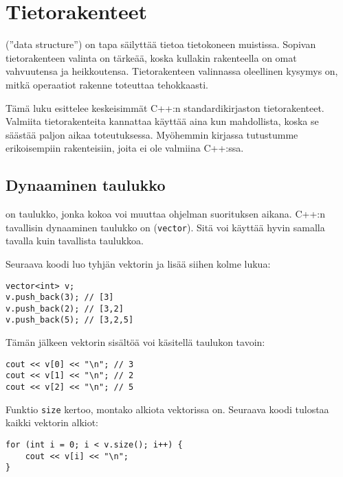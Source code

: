 \chapter{Tietorakenteet}


 (''data structure'')
on tapa säilyttää tietoa tietokoneen muistissa.
Sopivan tietorakenteen valinta on tärkeää,
koska kullakin rakenteella on omat
vahvuutensa ja heikkoutensa.
Tietorakenteen valinnassa oleellinen kysymys on,
mitkä operaatiot rakenne toteuttaa tehokkaasti.

Tämä luku esittelee keskeisimmät
C++:n standardikirjaston tietorakenteet.
Valmiita tietorakenteita kannattaa käyttää
aina kun mahdollista, 
koska se säästää paljon aikaa toteutuksessa.
Myöhemmin kirjassa tutustumme erikoisempiin
rakenteisiin, joita ei ole valmiina C++:ssa.

\section{Dynaaminen taulukko}


 on taulukko,
jonka kokoa voi muuttaa
ohjelman suorituksen aikana.
C++:n tavallisin dynaaminen taulukko
on  (\texttt{vector}).
Sitä voi käyttää hyvin samalla tavalla
kuin tavallista taulukkoa.

Seuraava koodi luo tyhjän vektorin
ja lisää siihen kolme lukua:

\begin{lstlisting}
vector<int> v;
v.push_back(3); // [3]
v.push_back(2); // [3,2]
v.push_back(5); // [3,2,5]
\end{lstlisting}

Tämän jälkeen vektorin sisältöä voi käsitellä taulukon tavoin:

\begin{lstlisting}
cout << v[0] << "\n"; // 3
cout << v[1] << "\n"; // 2
cout << v[2] << "\n"; // 5
\end{lstlisting}

Funktio \texttt{size} kertoo, montako alkiota vektorissa on.
Seuraava koodi tulostaa kaikki vektorin alkiot:

\begin{lstlisting}
for (int i = 0; i < v.size(); i++) {
    cout << v[i] << "\n";
}
\end{lstlisting}

